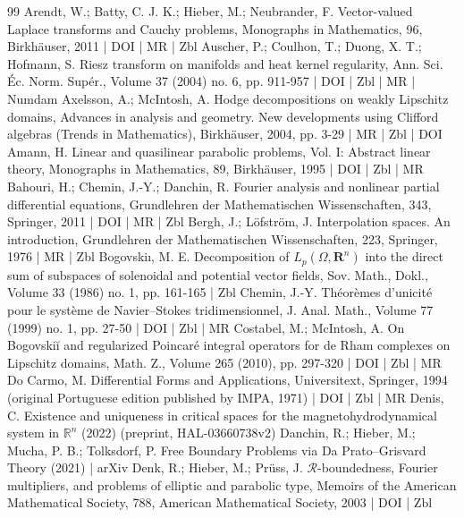 \documentclass[10pt]{amsart}
\theoremstyle{definition}\newtheorem{defi}[theo]{Definition}\newtheorem{rema}[theo]{Remark}\newtheorem{exam}[theo]{Example}\newtheorem{exem}[theo]{Example}\newtheorem{nota}[theo]{Notation}
\begin{document}
\begin{thebibliography}{99}
 Arendt, W.; Batty, C. J. K.; Hieber, M.; Neubrander, F. Vector-valued Laplace transforms and Cauchy problems, Monographs in Mathematics, 96, Birkhäuser, 2011 | DOI | MR | Zbl
 Auscher, P.; Coulhon, T.; Duong, X. T.; Hofmann, S. Riesz transform on manifolds and heat kernel regularity, Ann. Sci. Éc. Norm. Supér., Volume 37 (2004) no. 6, pp. 911-957 | DOI | Zbl | MR | Numdam
 Axelsson, A.; McIntosh, A. Hodge decompositions on weakly Lipschitz domains, Advances in analysis and geometry. New developments using Clifford algebras (Trends in Mathematics), Birkhäuser, 2004, pp. 3-29 | MR | Zbl | DOI
 Amann, H. Linear and quasilinear parabolic problems, Vol. I: Abstract linear theory, Monographs in Mathematics, 89, Birkhäuser, 1995 | DOI | Zbl | MR
 Bahouri, H.; Chemin, J.-Y.; Danchin, R. Fourier analysis and nonlinear partial differential equations, Grundlehren der Mathematischen Wissenschaften, 343, Springer, 2011 | DOI | MR | Zbl
 Bergh, J.; Löfström, J. Interpolation spaces. An introduction, Grundlehren der Mathematischen Wissenschaften, 223, Springer, 1976 | MR | Zbl
 Bogovskiı, M. E. Decomposition of ${L}_p(\Omega ,\mathbf{R}^n)$ into the direct sum of subspaces of solenoidal and potential vector fields, Sov. Math., Dokl., Volume 33 (1986) no. 1, pp. 161-165 | Zbl
 Chemin, J.-Y. Théorèmes d’unicité pour le système de Navier–Stokes tridimensionnel, J. Anal. Math., Volume 77 (1999) no. 1, pp. 27-50 | DOI | Zbl | MR
 Costabel, M.; McIntosh, A. On Bogovskiĭ and regularized Poincaré integral operators for de Rham complexes on Lipschitz domains, Math. Z., Volume 265 (2010), pp. 297-320 | DOI | Zbl | MR
 Do Carmo, M. Differential Forms and Applications, Universitext, Springer, 1994 (original Portuguese edition published by IMPA, 1971) | DOI | Zbl | MR
 Denis, C. Existence and uniqueness in critical spaces for the magnetohydrodynamical system in $\mathbb{R}^n$ (2022) (preprint, HAL-03660738v2)
 Danchin, R.; Hieber, M.; Mucha, P. B.; Tolksdorf, P. Free Boundary Problems via Da Prato–Grisvard Theory (2021) | arXiv
 Denk, R.; Hieber, M.; Prüss, J. $\mathcal{R}$-boundedness, Fourier multipliers, and problems of elliptic and parabolic type, Memoirs of the American Mathematical Society, 788, American Mathematical Society, 2003 | DOI | Zbl

\end{thebibliography}
\end{document}
